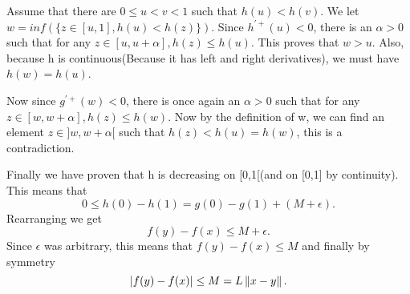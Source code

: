 \begin{solution}[]
Assume that there are $0 \leq  u < v < 1 $ such that $ h(u) < h(v)$. We let
$w = inf(\{ z \in[u,1], h(u) < h(z) \})  $. Since $ h^{\prime+}(u) < 0 $, there is an $ \alpha >0 $ such that for any $
	z\in[u,u+ \alpha], h(z) \leq h(u) $.
This proves that $ w > u $. Also, because h is continuous(Because it has left and right derivatives), we must have
$ h(w)=h(u) $.

Now since $ g^{\prime+}(w) <0 $, there is once again an $ \alpha >0 $ such that for any $ z\in[w, w +
\alpha], h(z) \leq h(w) $. Now by the definition of w, we can find an element $ z \in ]w, w + \alpha [$ such that $ h(z)
< h(u) = h(w)$, this is a contradiction.

Finally we have proven that h is decreasing on [0,1[(and on [0,1] by continuity). This means that
\begin{equation*}
	0 \leq h(0) - h(1) = g(0) - g(1) + (M+ \epsilon).
\end{equation*}
Rearranging we get 
\begin{equation*}
	f(y) -f(x) \leq M+ \epsilon.
\end{equation*}
Since $ \epsilon $ was arbitrary, this means that $ f(y) - f(x) \leq M $ and finally by symmetry
\begin{equation*}
	|f(y)-f(x)| \leq M = L \left\|x-y\right\|.
\end{equation*}


\end{solution}
